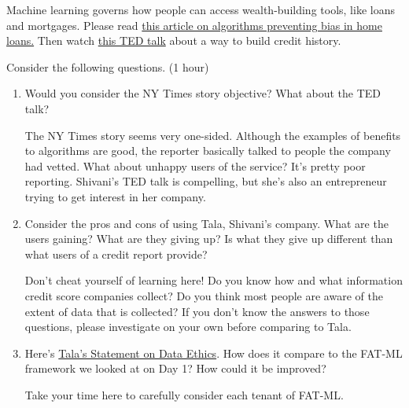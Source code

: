 \documentclass[assignment04_Solutions]{subfiles}
\begin{document}
Machine learning governs how people can access wealth-building tools, like loans and mortgages.
Please read \href{https://www.nytimes.com/2020/09/18/business/digital-mortgages.html}{this article on algorithms preventing bias in home loans.} Then watch \href{https://www.ted.com/talks/shivani_siroya_a_smart_loan_for_people_with_no_credit_history_yet/up-next?language=en}{this TED talk} about a way to build credit history.
\begin{exercise} 
Consider the following questions. (1 hour)
\begin{enumerate}
\item Would you consider the NY Times story objective? What about the TED talk?
\begin{boxedsolution}
The NY Times story seems very one-sided. Although the examples of benefits to algorithms are good, the reporter basically talked to people the company had vetted. What about unhappy users of the service? It's pretty poor reporting. Shivani's TED talk is compelling, but she's also an entrepreneur trying to get interest in her company.
\end{boxedsolution}

\item Consider the pros and cons of using Tala, Shivani's company. What are the users gaining? What are they giving up? Is what they give up different than what users of a credit report provide?

\begin{boxedsolution}
Don't cheat yourself of learning here! Do you know how and what information credit score companies collect? Do you think most people are aware of the extent of data that is collected? If you don't know the answers to those questions, please investigate on your own before comparing to Tala.
\end{boxedsolution}

\item Here's \href{https://tala.co/data-ethics/}{Tala's Statement on Data Ethics}. How does it compare to the FAT-ML framework we looked at on Day 1? How could it be improved?
\begin{boxedsolution}
Take your time here to carefully consider each tenant of FAT-ML.
\end{boxedsolution}

\end{enumerate}
\end{exercise}


\end{document}
